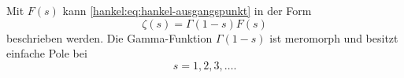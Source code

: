 Mit $F(s)$ kann \eqref{hankel:eq:hankel-ausgangspunkt} in der Form
\begin{equation}
\zeta(s)
=
\Gamma(1-s)F(s)
\label{hankel:eq:fortsetzung-hankel}
\end{equation}
beschrieben werden. 
Die Gamma-Funktion $\Gamma(1-s)$ ist meromorph und besitzt
einfache Pole bei
\begin{equation}
s=1,2,3,\ldots.
\label{hankel:eq:gamma-pole-1-s}
\end{equation}

%			
%			
%			
%			
%			
